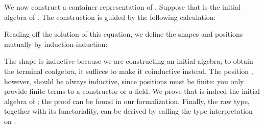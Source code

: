 

We now construct a container representation of . Suppose that \;\AgdaSymbol{=}\;\;\; is the initial algebra of . The construction is guided by the following calculation:



Reading off the solution of this equation, we define the shapes and positions mutually by induction-induction:



The shape  is inductive because we are constructing an initial algebra; to obtain the terminal coalgebra, it suffices to make it coinductive instead. The position , however, should be always inductive, since positions must be finite: you only provide finite terms to a constructor or a field. We prove that  is indeed the initial algebra of ; the proof can be found in our formalization. Finally, the raw  type, together with its functoriality, can be derived by calling the type interpretation  on .
